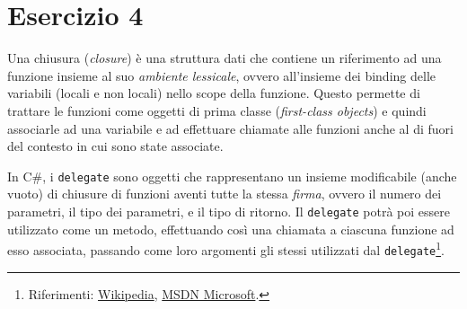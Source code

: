 \section{Esercizio 4}

Una chiusura (\emph{closure}) è una struttura dati che contiene un riferimento
ad una funzione insieme al suo \emph{ambiente lessicale}, ovvero all'insieme dei
binding delle variabili (locali e non locali) nello scope della funzione. Questo
permette di trattare le funzioni come oggetti di prima classe (\emph{first-class
objects}) e quindi associarle ad una variabile e ad effettuare chiamate alle
funzioni anche al di fuori del contesto in cui sono state associate.

In C\#, i {\tt delegate} sono oggetti che rappresentano un insieme modificabile
(anche vuoto) di chiusure di funzioni aventi tutte la stessa \emph{firma},
ovvero il numero dei parametri, il tipo dei parametri, e il tipo di ritorno. Il
{\tt delegate} potrà poi essere utilizzato come un metodo, effettuando così una
chiamata a ciascuna funzione ad esso associata, passando come loro argomenti gli
stessi utilizzati dal {\tt delegate}\footnote{Riferimenti:
\href{https://en.wikipedia.org/wiki/Closure_(computer_programming)}{Wikipedia},
\href{https://msdn.microsoft.com/en-us/library/ms173171.aspx}{MSDN Microsoft}.}.
